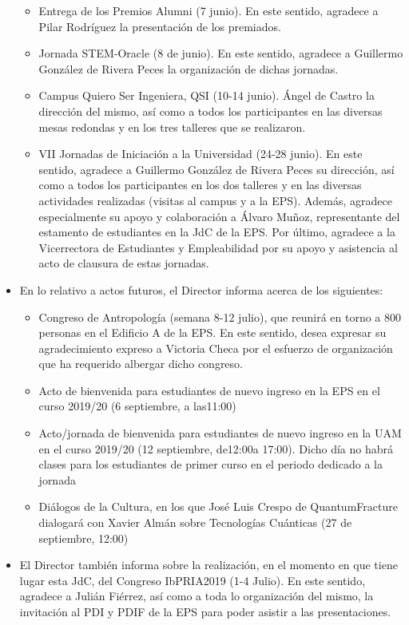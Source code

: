 \documentclass[numerado]{plantillasEPS} %
\begin{document}
\begin{itemize}
    \begin{itemize}
        \item Entrega  de  los  Premios  Alumni  (7  junio).  En  este  sentido,  agradece  a  Pilar Rodríguez la presentación de los premiados.
        \item Jornada  STEM-Oracle  (8  de  junio).  En  este  sentido,  agradece  a  Guillermo González de Rivera Peces la organización de dichas jornadas.
        \item Campus Quiero Ser Ingeniera, QSI (10-14 junio). Ángel de Castro la dirección del   mismo,   así   como a   todos   los   participantes   en   las   diversas   mesas redondas y en los tres talleres que se realizaron.
        \item VII  Jornadas  de  Iniciación  a  la  Universidad  (24-28  junio).  En  este  sentido, agradece a  Guillermo  González  de  Rivera  Peces  su  dirección,  así  como  a todos  los  participantes  en  los  dos  talleres  y  en  las  diversas  actividades realizadas (visitas al campus y a la EPS). Además, agradece especialmente su apoyo  y  colaboración  a Álvaro  Muñoz,  representante  del  estamento  de estudiantes  en  la  JdC  de  la  EPS. Por  último,  agradece  a  la  Vicerrectora  de Estudiantes y Empleabilidad por su apoyo y asistencia al acto de clausura de estas jornadas.
    \end{itemize}
    
    \item En lo relativo a actos futuros, el Director informa acerca de los siguientes:
    
    \begin{itemize}
        \item Congreso  de  Antropología  (semana  8-12  julio),  que  reunirá  en  torno  a  800 personas  en  el  Edificio  A  de  la  EPS.  En  este  sentido,  desea  expresar  su agradecimiento  expreso  a  Victoria  Checa  por  el  esfuerzo  de  organización que ha requerido albergar dicho congreso.
        \item Acto de bienvenida para estudiantes de nuevo ingreso en la EPS en el curso 2019/20 (6 septiembre, a las11:00)
        \item Acto/jornada  de  bienvenida  para estudiantes  de  nuevo  ingreso en  la UAM en  el curso 2019/20  (12  septiembre,  de12:00a  17:00).  Dicho  día  no  habrá clases  para  los  estudiantes  de  primer  curso en  el  periodo  dedicado  a  la jornada
        \item Diálogos  de  la  Cultura,  en  los que  José  Luis  Crespo  de  QuantumFracture dialogará con Xavier Almán sobre Tecnologías Cuánticas (27 de septiembre, 12:00)
    \end{itemize}    
    
    \item El Director también informa sobre la realización, en el momento en que tiene lugar esta JdC, del Congreso IbPRIA2019 (1-4 Julio). En este sentido, agradece a Julián Fiérrez, así como a toda lo organización del mismo, la invitación al PDI y PDIF de la EPS para poder asistir a las presentaciones.
\end{itemize}
\end{document}
